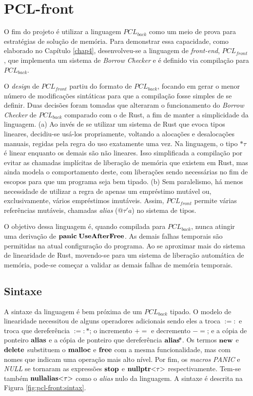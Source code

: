 \chapter{PCL-front}
\label{chap5}

O fim do projeto é utilizar a linguagem $PCL_{back}$ como um meio de prova para estratégias de solução de memória. Para demonstrar essa capacidade, como elaborado no Capítulo \ref{chap4}, desenvolveu-se a linguagem de \emph{front-end}, $PCL_{front}$, que implementa um sistema de \emph{Borrow Checker} e é definido via compilação para $PCL_{back}$.

O \emph{design} de $PCL_{front}$ partiu do formato de $PCL_{back}$, focando em gerar o menor número de modificações sintáticas para que a compilação fosse simples de se definir. Duas decisões foram tomadas que alteraram o funcionamento do \emph{Borrow Checker} de $PCL_{back}$ comparado com o de Rust, a fim de manter a simplicidade da linguagem. (a) Ao invés de se utilizar um sistema de Rust que evoca tipos lineares, decidiu-se usá-los propriamente, voltando a alocações e desalocações manuais, regidas pela regra do uso exatamente uma vez. Na linguagem, o tipo $\text{*}\tau$ é linear enquanto os demais são não lineares. Isso simplificada a compilação por evitar as chamadas implícitas de liberação de memória que existem em Rust, mas ainda modela o comportamento deste, com liberações sendo necessárias no fim de escopos para que um programa seja bem tipado. (b) Sem paralelismo, há menos necessidade de utilizar a regra de apenas um empréstimo mutável ou, exclusivamente, vários empréstimos imutáveis. Assim, $PCL_{front}$ permite várias referências mutáveis, chamadas \emph{alias} ($@\tau'a$) no sistema de tipos. 

O objetivo dessa linguagem é, quando compilada para $PCL_{back}$, nunca atingir uma derivação de $\mathbf{panic}\;\mathbf{UseAfterFree}$. As demais falhas temporais são permitidas na atual configuração do programa. Ao se aproximar mais do sistema de linearidade de Rust, movendo-se para um sistema de liberação automática de memória, pode-se começar a validar as demais falhas de memória temporais.

\section{Sintaxe}

A sintaxe da linguagem é bem próxima de um $PCL_{back}$ tipado. O modelo de linearidade necessitou de alguns operadores adicionais sendo eles a troca $:=:$ e troca que dereferência $:=:\!\!\text{*}$; o incremento $+\!\!=$ e decremento $-\!\!=$; e a cópia de ponteiro $\mathbf{alias}$ e a cópia de ponteiro que dereferência $\mathbf{alias}\!\text{*}$. Os termos $\mathbf{new}$ e $\mathbf{delete}$ substituem o $\mathbf{malloc}$ e $\mathbf{free}$ com a mesma funcionalidade, mas com nomes que indicam uma operação mais alto nível. Por fim, os \emph{macros} \emph{PANIC} e \emph{NULL} se tornaram as expressões $\mathbf{stop}$ e $\mathbf{nullptr}\text{<}\tau\text{>}$ respectivamente. Tem-se também $\mathbf{nullalias}\text{<}\tau\text{>}$ como o \emph{alias} nulo da linguagem. A sintaxe é descrita na Figura \ref{fig:pcl-front:sintax}.

